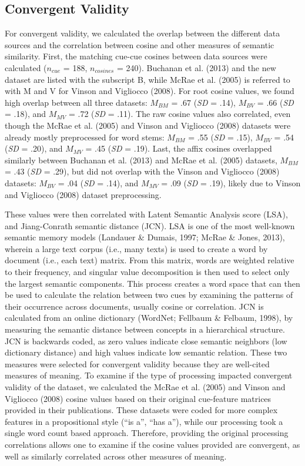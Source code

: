 \documentclass[english,,man]{apa6}
\begin{document}
\hypertarget{convergent-validity}{%
\subsection{Convergent Validity}\label{convergent-validity}}

For convergent validity, we calculated the overlap between the different data sources and the correlation between cosine and other measures of semantic similarity. First, the matching cue-cue cosines between data sources were calculated (\(n_{cue}\) = 188, \(n_{cosines}\) = 240). Buchanan et al. (2013) and the new dataset are listed with the subscript B, while McRae et al. (2005) is referred to with M and V for Vinson and Vigliocco (2008). For root cosine values, we found high overlap between all three datasets: \(M_{BM}\) = .67 (\emph{SD} = .14), \(M_{BV}\) = .66 (\emph{SD} = .18), and \(M_{MV}\) = .72 (\emph{SD} = .11). The raw cosine values also correlated, even though the McRae et al. (2005) and Vinson and Vigliocco (2008) datasets were already mostly preprocessed for word stems: \(M_{BM}\) = .55 (\emph{SD} = .15), \(M_{BV}\) = .54 (\emph{SD} = .20), and \(M_{MV}\) = .45 (\emph{SD} = .19). Last, the affix cosines overlapped similarly between Buchanan et al. (2013) and McRae et al. (2005) datasets, \(M_{BM}\) = .43 (\emph{SD} = .29), but did not overlap with the Vinson and Vigliocco (2008) datasets: \(M_{BV}\) = .04 (\emph{SD} = .14), and \(M_{MV}\) = .09 (\emph{SD} = .19), likely due to Vinson and Vigliocco (2008) dataset preprocessing.

These values were then correlated with Latent Semantic Analysis score (LSA), and Jiang-Conrath semantic distance (JCN). LSA is one of the most well-known semantic memory models (Landauer \& Dumais, 1997; McRae \& Jones, 2013), wherein a large text corpus (i.e., many texts) is used to create a word by document (i.e., each text) matrix. From this matrix, words are weighted relative to their frequency, and singular value decomposition is then used to select only the largest semantic components. This process creates a word space that can then be used to calculate the relation between two cues by examining the patterns of their occurrence across documents, usually cosine or correlation. JCN is calculated from an online dictionary (WordNet; Fellbaum \& Felbaum, 1998), by measuring the semantic distance between concepts in a hierarchical structure. JCN is backwards coded, as zero values indicate close semantic neighbors (low dictionary distance) and high values indicate low semantic relation. These two measures were selected for convergent validity because they are well-cited measures of meaning. To examine if the type of processing impacted convergent validity of the dataset, we calculated the McRae et al. (2005) and Vinson and Vigliocco (2008) cosine values based on their original cue-feature matrices provided in their publications. These datasets were coded for more complex features in a propositional style (\enquote{is a}, \enquote{has a}), while our processing took a single word count based approach. Therefore, providing the original processing correlations allows one to examine if the cosine values provided are convergent, as well as similarly correlated across other measures of meaning.
\end{document}
